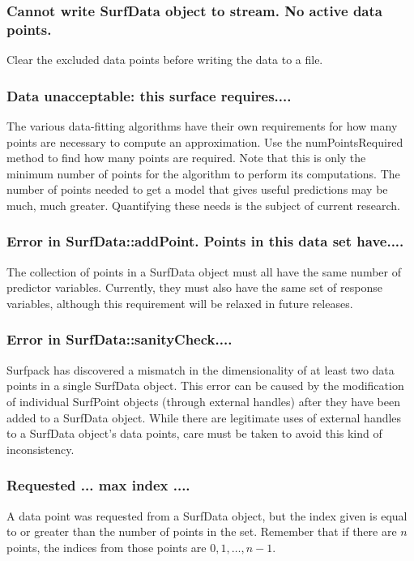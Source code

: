 \documentclass{article}
\begin{document}
\subsubsection{Cannot write SurfData object to stream.  No active data points.}
Clear the excluded data points before writing the data to a file.

\subsubsection{Data unacceptable: this surface requires....} 
The various data-fitting algorithms have their own requirements for how many
points are necessary to compute an approximation.  Use the numPointsRequired
method to find how many points are required.  Note that this is only the minimum
number of points for the algorithm to perform its computations.  The number of
points needed to get a model that gives useful predictions may be much, much
greater.  Quantifying these needs is the subject of current research.

\subsubsection{Error in SurfData::addPoint. Points in this data set have....}
The collection of points in a SurfData object must all have the same number of
predictor variables.  Currently, they must also have the same set of response
variables, although this requirement will be relaxed in future releases.

\subsubsection{Error in SurfData::sanityCheck....} 
Surfpack has discovered a mismatch in the dimensionality of at least two data
points in a single SurfData object.  This error can be caused by the
modification of individual SurfPoint objects (through external handles) after
they have been added to a SurfData object.  While there are legitimate uses of
external handles to a SurfData object's data points, care must be taken to avoid
this kind of inconsistency.

\subsubsection{Requested ... max index ....}
A data point was requested from a SurfData object, but the index given is equal
to or greater than the number of points in the set.  Remember that if there are
$n$ points, the indices from those points are $0, 1, \ldots, n-1$.
\end{document}
